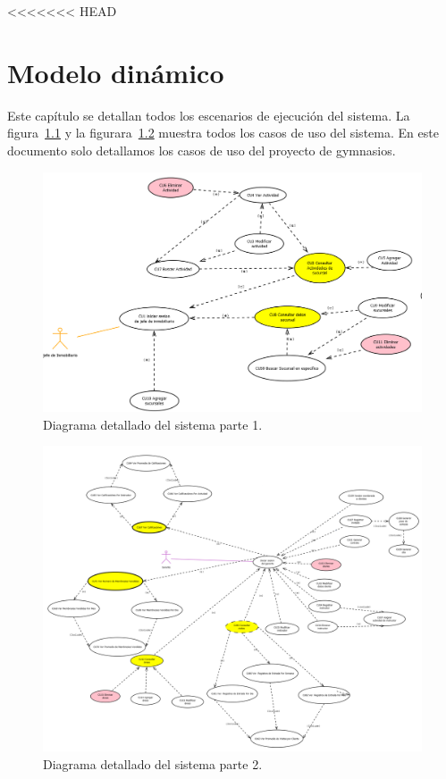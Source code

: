 <<<<<<< HEAD
\chapter{Modelo dinámico}	
\label{cap:modDinamico}

	Este capítulo se detallan todos los escenarios de ejecución del sistema. La figura~\ref{fig:CUcompleto1}  y la figurara~\ref{fig:CUcompleto2} muestra todos los casos de uso del sistema. En este documento solo detallamos los casos de uso del proyecto de gymnasios.

\begin{figure}[htbp]
	\begin{center}
		\includegraphics[angle=90, width=.7\textwidth]{images/cu/1J_inmobiliario}
		\caption{Diagrama detallado del sistema parte 1.}
		\label{fig:CUcompleto1}
	\end{center}
\end{figure}

\begin{figure}[htbp]
	\begin{center}
		\includegraphics[angle=90, width=.8\textwidth]{images/cu/2Gerente}
		\caption{Diagrama detallado del sistema parte 2.}
		\label{fig:CUcompleto2}
	\end{center}
\end{figure}


